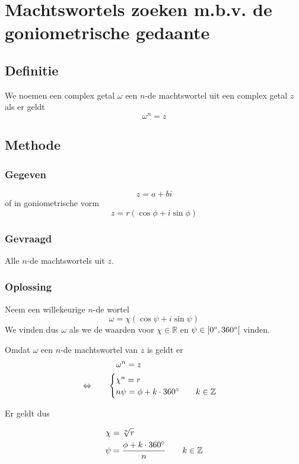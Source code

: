 \documentclass[12pt,twoside,a4paper]{article}
\begin{document}
\cleardoublepage
\section{Machtswortels zoeken m.b.v. de goniometrische gedaante}

\subsection{Definitie}

We noemen een complex getal $\omega$ een $n$-de machtswortel uit een complex getal $z$ als er geldt
\[\omega^n = z\]

\subsection{Methode}

\subsubsection*{Gegeven}
\[z=a+bi\]
of in goniometrische vorm
\[z=r(\cos\phi + i\sin\phi)\]

\subsubsection*{Gevraagd}
Alle $n$-de machtswortels uit $z$.

\subsubsection*{Oplossing}
Neem een willekeurige $n$-de wortel
\[\omega = \chi ( \cos \psi + i \sin \psi ) \]
We vinden dus $\omega$ als we de waarden voor $\chi\in\mathbb{R}$ en $\psi\in[0^\circ,360^\circ[$ vinden.

Omdat $\omega$ een $n$-de machtswortel van $z$ is geldt er
\begin{align*}
       & \quad \omega^n = z\\
  \Leftrightarrow \qquad & \begin{cases} \chi^n = r\\ n\psi = \phi + k \cdot 360^\circ \qquad k\in\mathbb{Z} \end{cases}
\end{align*}

Er geldt dus
\begin{mdframed}
  \begin{align*}
    \chi &= \sqrt[n]{r}\\
    \psi &= \dfrac{\phi + k \cdot 360^\circ}{n} \qquad k\in\mathbb{Z}
  \end{align*}
\end{mdframed}
\end{document}
